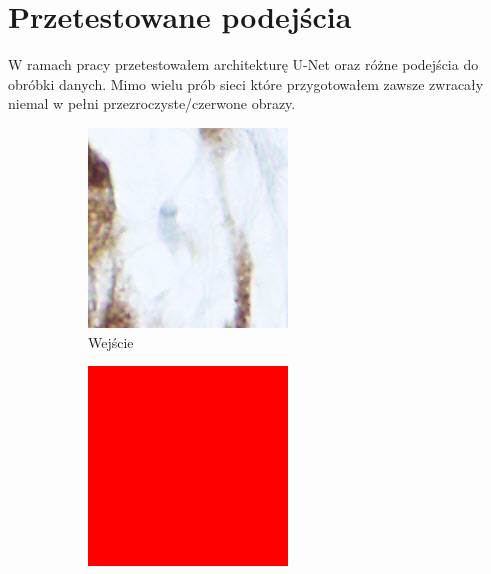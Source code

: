 \documentclass{article}
\begin{document}
\section{Przetestowane podejścia}
W ramach pracy przetestowałem architekturę U-Net oraz różne podejścia do obróbki danych.
Mimo wielu prób sieci które przygotowałem zawsze zwracały niemal w pełni przezroczyste/czerwone obrazy.
\begin{figure}[H]
    \centering
    \begin{subfigure}{0.4\linewidth}
        \includegraphics[width=\linewidth]{images/0_0_0.png}
        \caption{Wejście}
    \end{subfigure}
    \begin{subfigure}{0.4\linewidth}
        \includegraphics[width=\linewidth]{images/0_0_0_prediction.png}

\end{subfigure}
\end{figure}
\end{document}
